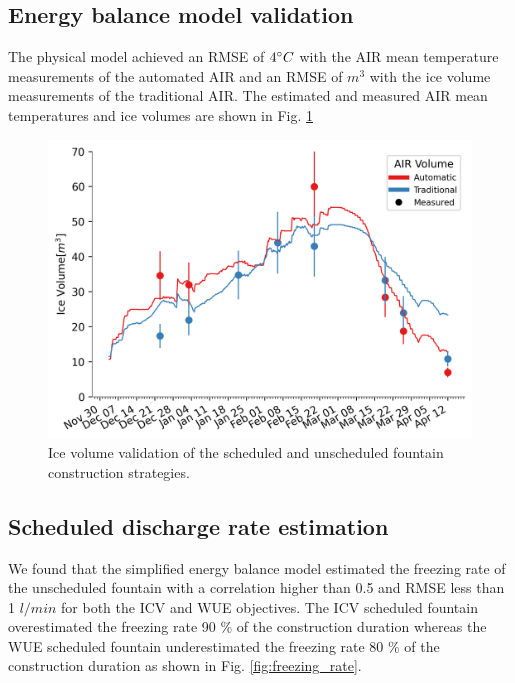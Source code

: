 \documentclass[tc, manuscript]{copernicus}
\begin{document}
\subsection{Energy balance model validation}
The physical model achieved an RMSE of $4 ^{\circ} C$ with the AIR mean temperature measurements of the automated AIR and an RMSE of $m^3$ with the ice volume measurements of the traditional AIR. The estimated and measured AIR
mean temperatures and ice volumes are shown in Fig. \ref{fig:validation}
 
\begin{figure}[t] 
  \includegraphics[width=12cm]{Figures/validation.png} 
  \caption{Ice volume validation of the scheduled and unscheduled fountain construction strategies.} 
\label{fig:validation} 
\end{figure}

\subsection{Scheduled discharge rate estimation}

We found that the simplified energy balance model estimated the freezing rate of the unscheduled fountain with a correlation higher than 0.5 and RMSE less than 1 $l/min$ for both the ICV and WUE objectives. The ICV scheduled fountain overestimated the freezing rate 90 \% of the construction duration whereas the WUE
scheduled fountain underestimated the freezing rate 80 \% of the construction duration as shown in Fig.
\ref{fig:freezing_rate}.

\end{document}
